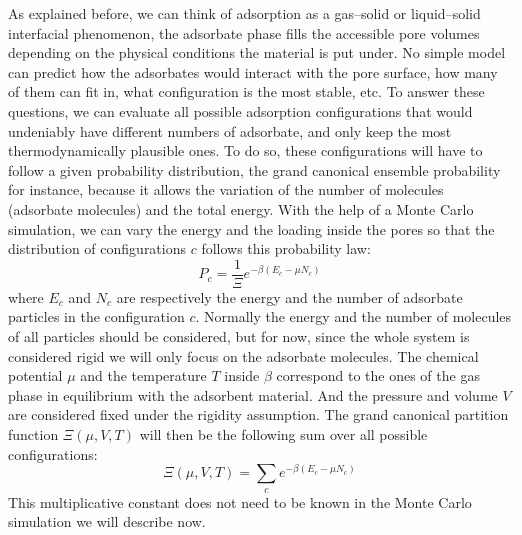 \documentclass[main.tex]{subfiles}
\begin{document}
As explained before, we can think of adsorption as a gas--solid or liquid--solid interfacial phenomenon, the adsorbate phase fills the accessible pore volumes depending on the physical conditions the material is put under. No simple model can predict how the adsorbates would interact with the pore surface, how many of them can fit in, what configuration is the most stable, etc. To answer these questions, we can evaluate all possible adsorption configurations that would undeniably have different numbers of adsorbate, and only keep the most thermodynamically plausible ones. To do so, these configurations will have to follow a given probability distribution, the grand canonical ensemble probability for instance, because it allows the variation of the number of molecules (adsorbate molecules) and the total energy. With the help of a Monte Carlo simulation, we can vary the energy and the loading inside the pores so that the distribution of configurations $c$ follows this probability law: 
\begin{equation}\label{eq:gc}
  P_c = \dfrac{1}{\Xi}e^{-\beta\left(E_c-\mu N_c\right)} 
\end{equation}
where $E_c$ and $N_c$ are respectively the energy and the number of adsorbate particles in the configuration $c$. Normally the energy and the number of molecules of all particles should be considered, but for now, since the whole system is considered rigid we will only focus on the adsorbate molecules. The chemical potential $\mu$ and the temperature $T$ inside $\beta$ correspond to the ones of the gas phase in equilibrium with the adsorbent material. And the pressure and volume $V$ are considered fixed under the rigidity assumption. The grand canonical partition function $\Xi(\mu,V,T)$ will then be the following sum over all possible configurations: 
\begin{equation}
  \Xi(\mu,V,T) = \sum\limits_c e^{-\beta\left(E_c-\mu N_c\right)} 
\end{equation}
This multiplicative constant does not need to be known in the Monte Carlo simulation we will describe now. 
\end{document}
